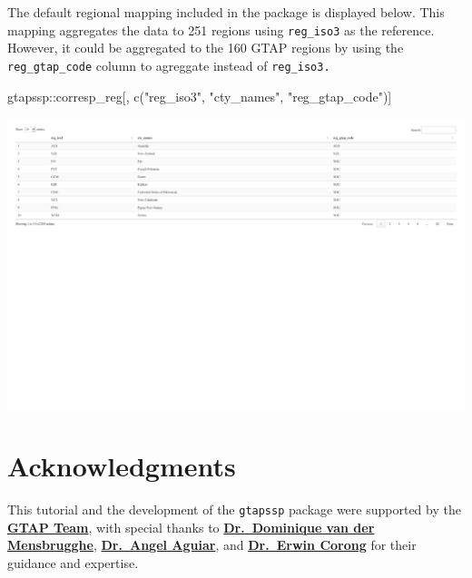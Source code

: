 \documentclass[
  letterpaper,
  DIV=11,
  numbers=noendperiod]{scrartcl}
\newenvironment{Shaded}{}{}
\newcommand{\FunctionTok}[1]{\textcolor[rgb]{0.39,0.29,0.61}{#1}}
\newcommand{\NormalTok}[1]{\textcolor[rgb]{0.12,0.11,0.11}{#1}}
\newcommand{\SpecialCharTok}[1]{\textcolor[rgb]{0.24,0.68,0.91}{#1}}
\newcommand{\StringTok}[1]{\textcolor[rgb]{0.75,0.01,0.01}{#1}}
\begin{document}
The default regional mapping included in the package is displayed below.
This mapping aggregates the data to 251 regions using \texttt{reg\_iso3}
as the reference. However, it could be aggregated to the 160 GTAP
regions by using the \texttt{reg\_gtap\_code} column to agreggate
instead of \texttt{reg\_iso3.}

\begin{Shaded}
\begin{Highlighting}[]
\NormalTok{gtapssp}\SpecialCharTok{::}\NormalTok{corresp\_reg[, }\FunctionTok{c}\NormalTok{(}\StringTok{"reg\_iso3"}\NormalTok{, }\StringTok{"cty\_names"}\NormalTok{, }\StringTok{"reg\_gtap\_code"}\NormalTok{)]}
\end{Highlighting}
\end{Shaded}

\includegraphics{index_files/figure-pdf/unnamed-chunk-32-1.pdf}

\section{Acknowledgments}\label{acknowledgments}

This tutorial and the development of the \texttt{gtapssp} package were
supported by the
\textbf{\href{https://www.gtap.agecon.purdue.edu/default.asp}{GTAP
Team}}, with special thanks to
\href{https://www.gtap.agecon.purdue.edu/network/member_display.asp?UserID=415}{\textbf{Dr.~Dominique
van der Mensbrugghe}},
\href{https://www.gtap.agecon.purdue.edu/network/member_display.asp?UserID=6446}{\textbf{Dr.~Angel
Aguiar}}, and
\href{https://www.gtap.agecon.purdue.edu/network/member_display.asp?UserID=2958}{\textbf{Dr.~Erwin
Corong}} for their guidance and expertise.
\end{document}
